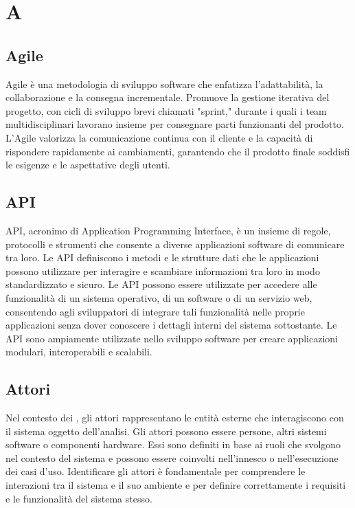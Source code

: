 \section{A}

\vspace{2em}
\subsection*{Agile}
Agile è una metodologia di sviluppo software che enfatizza l'adattabilità, la collaborazione e la consegna incrementale. Promuove la gestione iterativa del progetto, con cicli di sviluppo brevi chiamati "sprint," durante i quali i team multidisciplinari lavorano insieme per consegnare parti funzionanti del prodotto. L'Agile valorizza la comunicazione continua con il cliente e la capacità di rispondere rapidamente ai cambiamenti, garantendo che il prodotto finale soddisfi le esigenze e le aspettative degli utenti.

\vspace{2em}
\subsection*{API}
API, acronimo di Application Programming Interface, è un insieme di regole, protocolli e strumenti che consente a diverse applicazioni software di comunicare tra loro. Le API definiscono i metodi e le strutture dati che le applicazioni possono utilizzare per interagire e scambiare informazioni tra loro in modo standardizzato e sicuro. Le API possono essere utilizzate per accedere alle funzionalità di un sistema operativo, di un software o di un servizio web, consentendo agli sviluppatori di integrare tali funzionalità nelle proprie applicazioni senza dover conoscere i dettagli interni del sistema sottostante. Le API sono ampiamente utilizzate nello sviluppo software per creare applicazioni modulari, interoperabili e scalabili.

\vspace{2em}
\subsection*{Attori}
Nel contesto dei , gli attori rappresentano le entità esterne che interagiscono con il sistema oggetto dell'analisi. Gli attori possono essere persone, altri sistemi software o componenti hardware. Essi sono definiti in base ai ruoli che svolgono nel contesto del sistema e possono essere coinvolti nell'innesco o nell'esecuzione dei casi d'uso. Identificare gli attori è fondamentale per comprendere le interazioni tra il sistema e il suo ambiente e per definire correttamente i requisiti e le funzionalità del sistema stesso.
